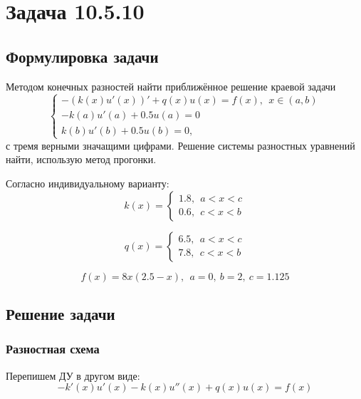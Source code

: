 \documentclass[12pt]{article}%
\begin{document}
\newpage
\section{Задача 10.5.10}
\subsection{Формулировка задачи}
Методом конечных разностей найти приближённое решение краевой задачи
\begin{equation*}
\begin{cases}
    -(k(x) u'(x))' + q(x)u(x) = f(x),\ \ x \in (a, b) \\
    -k(a)u'(a) + 0.5 u(a) = 0 \\
    k(b)u'(b) + 0.5 u(b) = 0,
\end{cases}
\end{equation*}
с тремя верными значащими цифрами. Решение системы разностных уравнений найти, использую метод прогонки.

Согласно индивидуальному варианту:
\begin{equation*}
k(x) = \begin{cases}
1.8,\ \ a < x < c \\
0.6,\ \ c < x < b
\end{cases}
\end{equation*}

\begin{equation*}
q(x) = \begin{cases}
6.5,\ \ a < x < c\\
7.8,\ \ c < x < b
\end{cases}
\end{equation*}

\begin{equation*}
f(x) = 8x (2.5 - x),\ \ a=0,\ b=2,\ c=1.125
\end{equation*}

\subsection{Решение задачи}
\subsubsection{Разностная схема}
Перепишем ДУ в другом виде:
\begin{equation*}
    -k'(x) u'(x) - k(x) u''(x) + q(x)u(x) = f(x)
\end{equation*}
\end{document}
